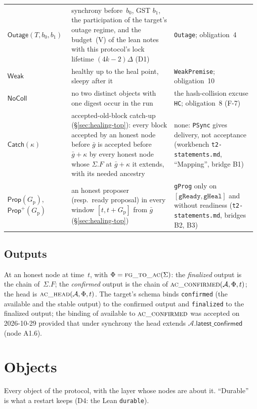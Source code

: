 \documentclass{article}
\newcommand{\AC}{\mathcal A}
\newcommand{\Fr}{\Phi}
\newcommand{\fname}[1]{\text{\textsc{#1}}}
\newcommand{\latestConfirmed}{\mathsf{latest\_confirmed}}
\begin{document}
\begin{longtable}{@{}>{\raggedright\arraybackslash}p{2.2cm}>{\raggedright\arraybackslash}p{6.4cm}>{\raggedright\arraybackslash}p{4.6cm}@{}}
$\mathsf{Outage}(T,b_0,b_1)$ & synchrony before~$b_0$, GST $b_1$, the
  participation of the target's outage regime, and the budget~(V) of the lean
  notes with this protocol's lock lifetime $(4k-2)\Delta$ (D1) &
  \texttt{Outage}; obligation~4\\
$\mathsf{Weak}$ & healthy up to the heal point, sleepy after it &
  \texttt{WeakPremise}; obligation~10\\
$\mathsf{NoColl}$ & no two distinct objects with one digest occur in the run &
  the hash-collision excuse \texttt{HC}; obligation~8 (F-7)\\
$\mathsf{Catch}(\kappa)$ & accepted-old-block catch-up
  (\S\ref{sec:healing-top}): every block accepted by an honest node before
  $\bar g$ is accepted before $\bar g+\kappa$ by every honest node whose
  $\Sigma.F$ at $\bar g+\kappa$ it extends, with its needed ancestry & none:
  \texttt{PSync} gives delivery, not acceptance (workbench
  \texttt{t2-statements.md}, ``Mapping'', bridge B1)\\
$\mathsf{Prop}(G_{\mathrm p})$, $\mathsf{Prop}^{+}(G_{\mathrm p})$ & an honest
  proposer (resp.\ ready proposal) in every window $[t,t+G_{\mathrm p}]$ from
  $\bar g$ (\S\ref{sec:healing-top}) & \texttt{gProg} only on
  $[\mathtt{gReady},\mathtt{gHeal}]$ and without readiness (\texttt{t2-statements.md},
  bridges B2, B3)\\
\hline
\end{longtable}

\subsection{Outputs}

At an honest node at time~$t$, with $\Fr=\fname{fg\_to\_ac}(\Sigma)$: the
\emph{finalized} output is the chain of~$\Sigma.F$; the \emph{confirmed}
output is the chain of $\fname{ac\_confirmed}(\AC,\Fr,t)$; the head is
$\fname{ac\_head}(\AC,\Fr,t)$.  The target's schema binds \texttt{confirmed}
(the available and the stable output) to the confirmed output and
\texttt{finalized} to the finalized output; the binding of available to
$\fname{ac\_confirmed}$ was accepted on 2026-10-29 provided that under
synchrony the head extends $\AC.\latestConfirmed$ (node A1.6).

\section{Objects}\label{sec:objects}

Every object of the protocol, with the layer whose nodes are about it.
``Durable'' is what a restart keeps (D4: the Lean \texttt{durable}).
\end{document}
